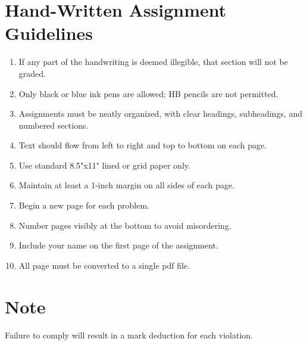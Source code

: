 \section*{Hand-Written Assignment Guidelines}
\begin{enumerate}[label=\arabic*.]
    \item If any part of the handwriting is deemed illegible, that section will not be graded.
    \item Only black or blue ink pens are allowed; HB pencils are not permitted.
    \item Assignments must be neatly organized, with clear headings, subheadings, and numbered sections.
    \item Text should flow from left to right and top to bottom on each page.
    \item Use standard 8.5"x11" lined or grid paper only.
    \item Maintain at least a 1-inch margin on all sides of each page.
    \item Begin a new page for each problem.
    \item Number pages visibly at the bottom to avoid misordering.
    \item Include your name on the first page of the assignment.
    \item All page must be converted to a single pdf file. 
\end{enumerate}

\section*{Note}
Failure to comply will result in a mark deduction for each violation.
